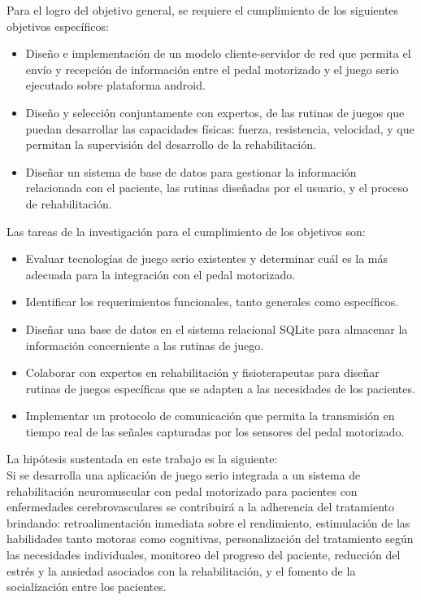 \begin{introduction}
    \vspace{5pt}
    Para el logro del objetivo general, se requiere el cumplimiento de los siguientes objetivos específicos:
    \begin{itemize}
        \item Diseño e implementación de un modelo cliente-servidor de red que permita el envío y recepción de información entre el pedal motorizado y el juego serio ejecutado sobre plataforma android.
        \item  Diseño y selección conjuntamente con expertos, de las rutinas de juegos que puedan desarrollar las capacidades físicas: fuerza, resistencia, velocidad, y que
        permitan la supervisión del desarrollo de la rehabilitación.
        \item Diseñar un sistema de base de datos para gestionar la información relacionada con el paciente, las rutinas diseñadas por el usuario, y el proceso de
        rehabilitación.
    \end{itemize}
    Las tareas de la investigación para el cumplimiento de los objetivos son:
    \begin{itemize}
        \item Evaluar tecnologías de juego serio existentes y determinar cuál es la más adecuada para la integración con el pedal motorizado.
        \item Identificar los requerimientos funcionales, tanto generales como específicos.
        \item Diseñar una base de datos en el sistema relacional SQLite para almacenar la información concerniente a las rutinas de juego. 
        \item Colaborar con expertos en rehabilitación y fisioterapeutas para diseñar rutinas de juegos específicas que se adapten a las necesidades de los pacientes.
        \item Implementar un protocolo de comunicación que permita la transmisión en tiempo real de las señales capturadas por los sensores del pedal motorizado. 
    \end{itemize}

    La hipótesis sustentada en este trabajo es la siguiente:\\
    Si se desarrolla una aplicación de juego serio integrada a un sistema de rehabilitación neuromuscular con pedal motorizado para pacientes con enfermedades cerebrovasculares se contribuirá a la adherencia del tratamiento brindando: retroalimentación inmediata sobre el rendimiento, estimulación de las habilidades tanto motoras como cognitivas, personalización del tratamiento según las necesidades individuales, monitoreo del progreso del paciente, reducción del estrés y la ansiedad asociados con la rehabilitación, y el fomento de la socialización entre los pacientes.


\end{introduction}
